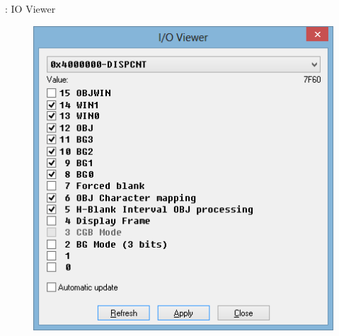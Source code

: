\documentclass{beamer}
\begin{document}
\begin{darkframes}
\begin{frame}{\subsecname: IO Viewer}
    \begin{figure}
        \centering
        \includegraphics[width=1\textwidth,height=0.5\textheight,keepaspectratio]{ioview}
    \end{figure}
\end{frame}


\end{darkframes}
\end{document}
